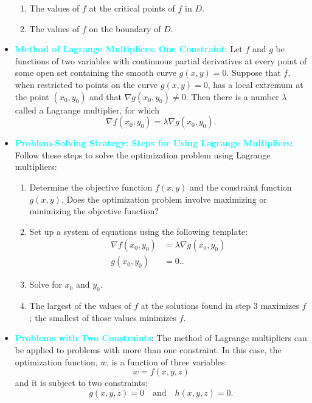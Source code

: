 \documentclass{report}
\begin{document}
\begin{itemize}
        \begin{enumerate}
            \item The values of $f$ at the critical points of $f$ in $D$.
            \item The values of $f$ on the boundary of $D$.
        \end{enumerate}
    \item \textbf{\textcolor{cyan}{Method of Lagrange Multipliers: One Constraint}}:
        Let $f$ and $g$ be functions of two variables with continuous partial derivatives at every point of some open set containing the smooth curve $g(x,y)=0$. Suppose that $f$, when restricted to points on the curve $g(x,y)=0$, has a local extremum at the point $(x_0,y_0)$ and that $\nabla g(x_0,y_0) \neq 0$. Then there is a number $\lambda$ called a Lagrange multiplier, for which
        \[
            \nabla f(x_0,y_0) = \lambda \nabla g(x_0,y_0).
        \]
    \item \textbf{\textcolor{cyan}{Problem-Solving Strategy: Steps for Using Lagrange Multipliers}}:
        Follow these steps to solve the optimization problem using Lagrange multipliers:
        \begin{enumerate}
            \item Determine the objective function $f(x,y)$ and the constraint function $g(x,y)$. Does the optimization problem involve maximizing or minimizing the objective function?
            \item Set up a system of equations using the following template:
                \begin{align*}
                    \nabla f(x_0,y_0) &= \lambda \nabla g(x_0,y_0)  \\
                    g(x_0,y_0) &= 0.
                .\end{align*}
            \item Solve for $x_0$ and $y_0$.
            \item The largest of the values of $f$ at the solutions found in step 3 maximizes $f$; the smallest of those values minimizes $f$.
        \end{enumerate}
    \item \textbf{\textcolor{cyan}{Problems with Two Constraints}}:
        The method of Lagrange multipliers can be applied to problems with more than one constraint. In this case, the optimization function, $w$, is a function of three variables:
        \[
            w = f(x, y, z)
        \]
        and it is subject to two constraints:
        \[
            g(x, y, z) = 0 \quad \text{and} \quad h(x, y, z) = 0.
\]
\end{itemize}
\end{document}
